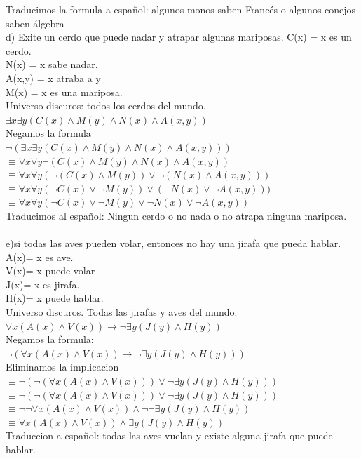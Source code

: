 \documentclass[paper=letter, fontsize=12pt]{scrartcl}
\begin{document}
Traducimos la formula a español: algunos monos saben Francés o algunos conejos saben álgebra\\

d) Exite un cerdo que puede nadar y atrapar algunas mariposas.
C(x) = x es un cerdo.\\
N(x) = x sabe nadar.\\
A(x,y) = x atraba a y\\
M(x) = x es una mariposa.\\
Universo discuros: todos los cerdos del mundo.
$\exists x \exists y(C(x) \wedge M(y) \wedge N(x) \wedge A(x,y))$\\

Negamos la formula\\
$\neg(\exists x \exists y(C(x) \wedge M(y) \wedge N(x) \wedge A(x,y)))$\\
$\equiv\forall x \forall y\neg(C(x) \wedge M(y) \wedge N(x) \wedge A(x,y))$\\
$\equiv\forall x \forall y(\neg(C(x) \wedge M(y)) \vee \neg(N(x) \wedge A(x,y)))$\\
$\equiv\forall x \forall y(\neg C(x) \vee \neg M(y)) \vee (\neg N(x) \vee \neg A(x,y)))$\\
$\equiv\forall x \forall y(\neg C(x) \vee \neg M(y) \vee \neg N(x) \vee \neg A(x,y))$\\

Traducimos al español: Ningun cerdo o no nada o no atrapa ninguna mariposa.\\ \\
e)si todas las aves pueden volar, entonces no hay una jirafa que pueda hablar.\\
A(x)= x es ave.\\
V(x)= x puede volar\\
J(x)= x es jirafa.\\
H(x)= x puede hablar.\\
Universo discuros. Todas las jirafas y aves del mundo.\\
$\forall x(A(x)\wedge V(x)) \rightarrow \neg\exists y(J(y)\wedge H(y))$\\

Negamos la formula:\\
$\neg(\forall x(A(x)\wedge V(x)) \rightarrow \neg\exists y(J(y)\wedge H(y)))$\\
Eliminamos la implicacion
$\equiv \neg(\neg(\forall x(A(x)\wedge V(x))) \vee \neg\exists y(J(y)\wedge H(y)))$\\
$\equiv \neg(\neg(\forall x(A(x)\wedge V(x))) \vee \neg\exists y(J(y)\wedge H(y)))$\\
$\equiv\neg\neg\forall x(A(x)\wedge V(x)) \wedge \neg\neg\exists y(J(y)\wedge H(y))$\\
$\equiv\forall x(A(x)\wedge V(x)) \wedge \exists y(J(y)\wedge H(y))$\\

Traduccion a español: todas las aves vuelan y existe alguna jirafa que puede hablar.\\
\end{document}
